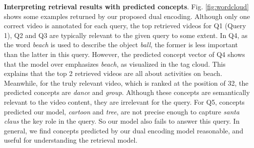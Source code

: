 \textbf{Interpreting retrieval results with predicted concepts}. 
Fig. \ref{fig:wordcloud} shows some examples returned by our proposed dual encoding. 
Although only one correct video is annotated for each query, the top retrieved videos for Q1 (Query 1), Q2 and Q3 are typically relevant to the given query to some extent. 
In Q4, as the word \textit{beach} is used to describe the object \textit{ball}, the former is less important than the latter in this query. However, the predicted concept vector of Q4 shows that the model over emphasizes \textit{beach}, as visualized in the tag cloud. This explains that the top 2 retrieved videos are all about activities on beach. Meanwhile, for the truly relevant video, which is ranked at the position of 32, the predicted concepts are \textit{dance} and \textit{group}. Although these concepts are semantically relevant to the video content, they are irrelevant for the query.  
For Q5, concepts predicted our model, \eg \textit{cartoon} and \textit{tree}, are not precise enough to capture \textit{santa claus} the key role in the query. So our model also fails to answer this query. 
In general, we find concepts predicted by our dual encoding model  reasonable, and useful for understanding the retrieval model.



\begin{table} [tb!]
\renewcommand{\arraystretch}{1}
\caption{\textbf{Comparison with MMT in terms of model size and computation overhead at the inference stage}.  For each model, we measure the amount of FLOPs it takes to encode a given video-text pair. The computational cost of video feature extraction is excluded as that step is typically performed once in an offline mode. Numbers in parentheses indicate relative changes against MMT.}
\vspace{-3mm}
\label{tab:dual_transformer_complex}
\centering 
{}\end{table}



